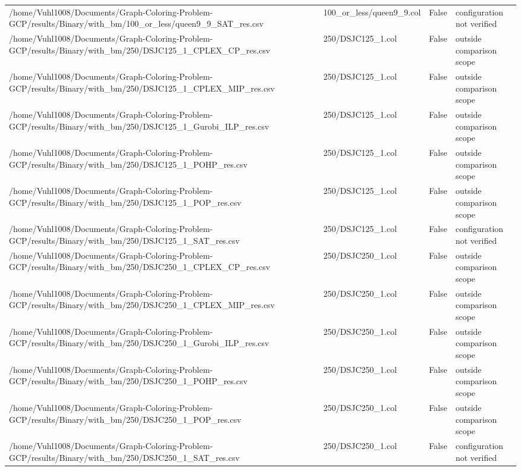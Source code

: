 \begin{table}[htbp]
\begin{tabular}{llll}
/home/Vuhl1008/Documents/Graph-Coloring-Problem-GCP/results/Binary/with\_bm/100\_or\_less/queen9\_9\_SAT\_res.csv & 100\_or\_less/queen9\_9.col & False & configuration not verified \\
/home/Vuhl1008/Documents/Graph-Coloring-Problem-GCP/results/Binary/with\_bm/250/DSJC125\_1\_CPLEX\_CP\_res.csv & 250/DSJC125\_1.col & False & outside comparison scope \\
/home/Vuhl1008/Documents/Graph-Coloring-Problem-GCP/results/Binary/with\_bm/250/DSJC125\_1\_CPLEX\_MIP\_res.csv & 250/DSJC125\_1.col & False & outside comparison scope \\
/home/Vuhl1008/Documents/Graph-Coloring-Problem-GCP/results/Binary/with\_bm/250/DSJC125\_1\_Gurobi\_ILP\_res.csv & 250/DSJC125\_1.col & False & outside comparison scope \\
/home/Vuhl1008/Documents/Graph-Coloring-Problem-GCP/results/Binary/with\_bm/250/DSJC125\_1\_POHP\_res.csv & 250/DSJC125\_1.col & False & outside comparison scope \\
/home/Vuhl1008/Documents/Graph-Coloring-Problem-GCP/results/Binary/with\_bm/250/DSJC125\_1\_POP\_res.csv & 250/DSJC125\_1.col & False & outside comparison scope \\
/home/Vuhl1008/Documents/Graph-Coloring-Problem-GCP/results/Binary/with\_bm/250/DSJC125\_1\_SAT\_res.csv & 250/DSJC125\_1.col & False & configuration not verified \\
/home/Vuhl1008/Documents/Graph-Coloring-Problem-GCP/results/Binary/with\_bm/250/DSJC250\_1\_CPLEX\_CP\_res.csv & 250/DSJC250\_1.col & False & outside comparison scope \\
/home/Vuhl1008/Documents/Graph-Coloring-Problem-GCP/results/Binary/with\_bm/250/DSJC250\_1\_CPLEX\_MIP\_res.csv & 250/DSJC250\_1.col & False & outside comparison scope \\
/home/Vuhl1008/Documents/Graph-Coloring-Problem-GCP/results/Binary/with\_bm/250/DSJC250\_1\_Gurobi\_ILP\_res.csv & 250/DSJC250\_1.col & False & outside comparison scope \\
/home/Vuhl1008/Documents/Graph-Coloring-Problem-GCP/results/Binary/with\_bm/250/DSJC250\_1\_POHP\_res.csv & 250/DSJC250\_1.col & False & outside comparison scope \\
/home/Vuhl1008/Documents/Graph-Coloring-Problem-GCP/results/Binary/with\_bm/250/DSJC250\_1\_POP\_res.csv & 250/DSJC250\_1.col & False & outside comparison scope \\
/home/Vuhl1008/Documents/Graph-Coloring-Problem-GCP/results/Binary/with\_bm/250/DSJC250\_1\_SAT\_res.csv & 250/DSJC250\_1.col & False & configuration not verified \\

\end{tabular}
\end{table}
